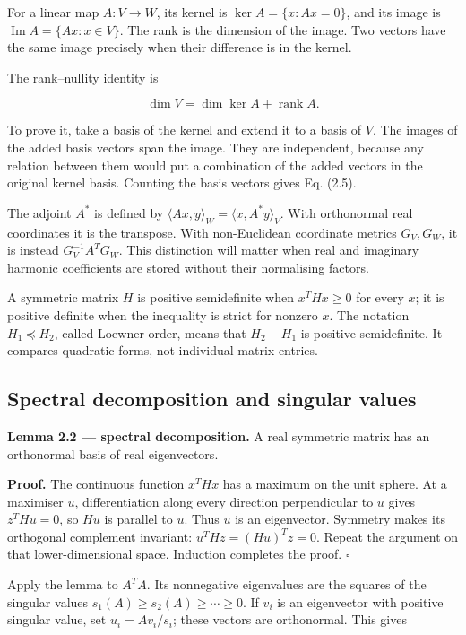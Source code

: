 \documentclass[
  11pt,
  a4paper]{article}
\begin{document}
For a linear map \(A:V\to W\), its kernel is \(\ker A=\{x:Ax=0\}\), and its image is \(\operatorname{Im}A=\{Ax:x\in V\}\). The rank is the dimension of the image. Two vectors have the same image precisely when their difference is in the kernel.

The rank--nullity identity is

\[
\dim V=\dim\ker A+\operatorname{rank}A.
\tag{2.5}
\]

To prove it, take a basis of the kernel and extend it to a basis of \(V\). The images of the added basis vectors span the image. They are independent, because any relation between them would put a combination of the added vectors in the original kernel basis. Counting the basis vectors gives Eq. (2.5).

The adjoint \(A^*\) is defined by \(\langle Ax,y\rangle_W=\langle x,A^*y\rangle_V\). With orthonormal real coordinates it is the transpose. With non-Euclidean coordinate metrics \(G_V,G_W\), it is instead \(G_V^{-1}A^TG_W\). This distinction will matter when real and imaginary harmonic coefficients are stored without their normalising factors.

A symmetric matrix \(H\) is positive semidefinite when \(x^THx\ge0\) for every \(x\); it is positive definite when the inequality is strict for nonzero \(x\). The notation \(H_1\preceq H_2\), called Loewner order, means that \(H_2-H_1\) is positive semidefinite. It compares quadratic forms, not individual matrix entries.

\hypertarget{spectral-decomposition-and-singular-values}{%
\subsection{Spectral decomposition and singular values}\label{spectral-decomposition-and-singular-values}}

\textbf{Lemma 2.2 --- spectral decomposition.} A real symmetric matrix has an orthonormal basis of real eigenvectors.

\textbf{Proof.} The continuous function \(x^THx\) has a maximum on the unit sphere. At a maximiser \(u\), differentiation along every direction perpendicular to \(u\) gives \(z^THu=0\), so \(Hu\) is parallel to \(u\). Thus \(u\) is an eigenvector. Symmetry makes its orthogonal complement invariant: \(u^THz=(Hu)^Tz=0\). Repeat the argument on that lower-dimensional space. Induction completes the proof. \(\square\)

Apply the lemma to \(A^TA\). Its nonnegative eigenvalues are the squares of the singular values \(s_1(A)\ge s_2(A)\ge\cdots\ge0\). If \(v_i\) is an eigenvector with positive singular value, set \(u_i=Av_i/s_i\); these vectors are orthonormal. This gives
\end{document}
